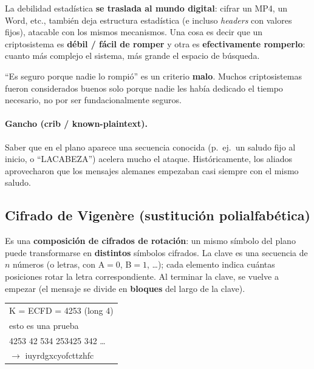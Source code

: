 \documentclass[../main.tex]{subfiles}
\begin{document}
\begin{destacado}
La debilidad estadística \textbf{se traslada al mundo digital}: cifrar un MP4,
un Word, etc., también deja estructura estadística (e incluso \emph{headers} con
valores fijos), atacable con los mismos mecanismos. Una cosa es decir que un
criptosistema es \textbf{débil / fácil de romper} y otra es \textbf{efectivamente
romperlo}: cuanto más complejo el sistema, más grande el espacio de búsqueda.
\end{destacado}

\begin{ojo}
``Es seguro porque nadie lo rompió'' es un criterio \textbf{malo}. Muchos
criptosistemas fueron considerados buenos solo porque nadie les había dedicado
el tiempo necesario, no por ser fundacionalmente seguros.
\end{ojo}

\paragraph{Gancho (crib / known-plaintext).} Saber que en el plano aparece una
secuencia conocida (p.\ ej.\ un saludo fijo al inicio, o ``LACABEZA'') acelera
mucho el ataque. Históricamente, los aliados aprovecharon que los mensajes
alemanes empezaban casi siempre con el mismo saludo.

\subsection{Cifrado de Vigenère (sustitución polialfabética)}

Es una \textbf{composición de cifrados de rotación}: un mismo símbolo del plano
puede transformarse en \textbf{distintos} símbolos cifrados. La clave es una
secuencia de $n$ números (o letras, con A$=0$, B$=1$, \dots); cada elemento
indica cuántas posiciones rotar la letra correspondiente. Al terminar la clave,
se vuelve a empezar (el mensaje se divide en \textbf{bloques} del largo de la
clave).

\begin{center}\ttfamily
\begin{tabular}{l}
K = ECFD = 4253 \quad (long 4) \\
esto es una prueba \\
4253 42 534 253425 342 \dots \\
$\to$ iuyrdgxcyofcttzhfc \\
\end{tabular}
\end{center}
\end{document}

